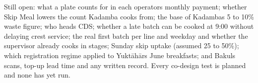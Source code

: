 \documentclass[
  10pt,
  table]{article}
\newcounter{none} %
\begin{document}
Still open: what a plate counts for in each operator\textquotesingle s monthly payment; whether Skip Meal lowers the count Kadamba cooks from; the base of Kadamba\textquotesingle s 5 to 10\% waste figure; who heads CDS; whether a late batch can be cooked at 9:00 without delaying crest service; the real first batch per line and weekday and whether the supervisor already cooks in stages; Sunday skip uptake (assumed 25 to 50\%); which registration regime applied to Yuktāhār\textquotesingle s June breakfasts; and Bakul\textquotesingle s scans, top-up lead time and any written record. Every co-design test is planned and none has yet run.
\end{document}
